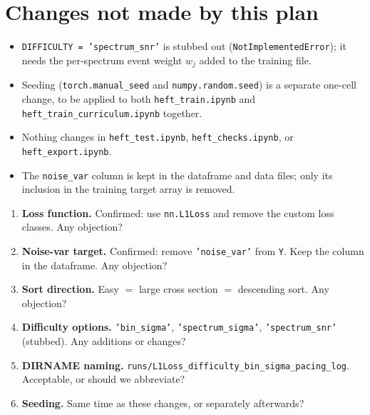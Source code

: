 \documentclass[11pt]{article}
\newcommand{\file}[1]{\nolinkurl{#1}}
\newcommand{\code}[1]{\texttt{#1}}
\begin{document}
\section{Changes not made by this plan}

\begin{itemize}
  \item \code{DIFFICULTY = 'spectrum\_snr'} is stubbed out (\code{NotImplementedError});
    it needs the per-spectrum event weight $w_j$ added to the training file.
  \item Seeding (\code{torch.manual\_seed} and \code{numpy.random.seed}) is a
    separate one-cell change, to be applied to both \file{heft\_train.ipynb}
    and \file{heft\_train\_curriculum.ipynb} together.
  \item Nothing changes in \file{heft\_test.ipynb}, \file{heft\_checks.ipynb},
    or \file{heft\_export.ipynb}.
  \item The \code{noise\_var} column is kept in the dataframe and data files;
    only its inclusion in the training target array is removed.
\end{itemize}

\begin{keyidea}
\begin{enumerate}
  \item \textbf{Loss function.} Confirmed: use \code{nn.L1Loss} and remove
    the custom loss classes. Any objection?
  \item \textbf{Noise-var target.} Confirmed: remove \code{'noise\_var'} from
    \code{Y}. Keep the column in the dataframe. Any objection?
  \item \textbf{Sort direction.} Easy $=$ large cross section $=$ descending
    sort. Any objection?
  \item \textbf{Difficulty options.} \code{'bin\_sigma'},
    \code{'spectrum\_sigma'}, \code{'spectrum\_snr'} (stubbed). Any additions
    or changes?
  \item \textbf{DIRNAME naming.}
    \file{runs/L1Loss\_difficulty\_bin\_sigma\_pacing\_log}. Acceptable, or
    should we abbreviate?
  \item \textbf{Seeding.} Same time as these changes, or separately
    afterwards?
\end{enumerate}
\end{keyidea}
\end{document}
